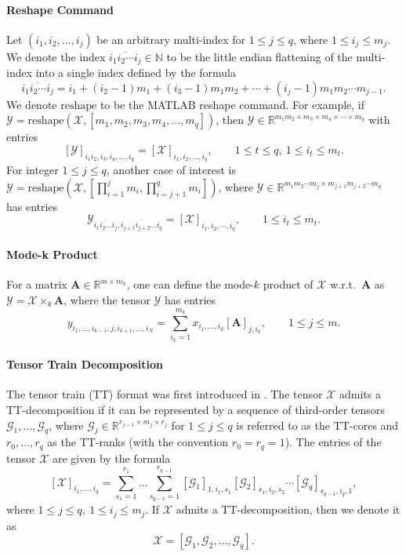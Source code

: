 \documentclass[final,3p,times]{elsarticle}
\newcommand{\mat}[1]{\boldsymbol{#1}}
\newcommand{\R}{\mathbb{R}}
\newcommand{\ten}[1]{\boldsymbol{\mathcal{#1}}}
\begin{document}
\paragraph{Reshape Command}
Let $(i_{1}, i_{2}, \ldots, i_{j})$ be an arbitrary multi-index for $1 \leq j \leq q$, where $1 \leq i_{j} \leq m_{j}$. We denote the index $\overline{i_{1} i_{2} \cdots i_{j}} \in \mathbb{N}$ to be the little endian flattening of the multi-index into a single index defined by the formula
\[
\overline{i_{1} i_{2} \cdots i_{j}} 
= i_{1} + (i_{2}-1)m_{1} + (i_{3}-1)m_{1}m_{2} + \cdots + (i_{j}-1)m_{1}m_{2}\cdots m_{j-1}. 
\]
We denote $\text{reshape}$ to be the MATLAB reshape command. For example, if $\ten{Y} = \text{reshape}(\ten{X},[m_1, m_2, m_3, m_4, \dots, m_q])$, then $\ten{Y} \in \R^{m_1m_2 \times m_3 \times m_4 \times  \cdots \times m_q}$ with entries 
$$[\ten{Y}]_{\overline{i_1i_2}, i_3, i_4, \dots, i_{q} } = [\ten{X}]_{i_1, i_2, \dots, i_{q}}, \qquad  1 \le t \le q, ~ 1 \le i_t \le m_t.$$
For integer $1 \le j \le q$, another case of interest is $\ten{Y} = \text{reshape}(\ten{X}, [\prod_{i=1}^{j}m_i, \prod_{i=j+1}^{q}m_i ])$, where $\ten{Y} \in \R^{m_1m_2\cdots m_j \times m_{j+1}m_{j+2}\cdots m_q}$ has entries 
$$\ten{Y}_{\overline{i_1i_2\dots i_j}, \overline{i_{j+1}i_{j+2}\dots i_q}} = [\ten{X}]_{i_1, i_2, \cdots, i_q}, \qquad 1 \le i_t \le m_t. $$





\paragraph{Mode-k Product}
For a matrix $\mat{A} \in \mathbb{R}^{m \times m_k}$, one can define the mode-$k$ product of $\ten{X}$ w.r.t.\  $\mat{A}$ as
$\ten{Y} = \ten{X} \times_{k} \mat{A}$, where the tensor $\ten{Y}$ has entries
$$y_{i_1, \dots, i_{k-1}, j, i_{k+1}, \dots, i_N} = \sum^{m_k}_{i_k=1}x_{i_1,\dots, i_d}[\mat{A}]_{j, i_k} , \qquad 1 \le j \le m.$$  

\paragraph{Tensor Train Decomposition}
 The tensor train (TT) format was first introduced in \cite{oseledets2011tensor}. The tensor $\ten{X}$ admits a TT-decomposition if it can be represented by a sequence of third-order tensors $\ten{G}_1,\dots,\ten{G}_q$, where $\ten{G}_j \in \mathbb{R}^{r_{j-1} \times m_j \times r_{j}}$ for $1 \leq j \leq q$  is referred to as the TT-cores and $r_0, \dots, r_q$ as the TT-ranks (with the convention  $r_0 = r_{q} = 1$). The entries of the tensor $\ten{X}$ are given by the  formula
$$[\ten{X}]_{i_1,\dots,i_q} = \sum^{r_1}_{s_1 = 1} \dots \sum^{r_{q-1}}_{s_{q-1}=1} [\ten{G}_1]_{1, i_1, s_1} [\ten{G}_2]_{s_1, i_2, s_2} \cdots [\ten{G}_q]_{s_{q-1}, i_q, 1},$$
where $1 \le j \le q, ~ 1 \le i_j \le m_j$.
If $\ten{X}$ admits a TT-decomposition, then we denote it as 
$$\ten{X} = [\ten{G}_1, \ten{G}_2, \dots,\ten{G}_q ].$$
\end{document}
